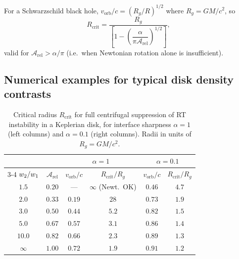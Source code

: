 For a Schwarzschild black hole,
$v_{\mathrm{orb}}/c = (R_{g}/R)^{1/2}$ where
$R_{g} = GM/c^{2}$, so
\begin{equation}
\boxed{\;
R_{\mathrm{crit}}
  = \frac{R_{g}}{\left[1 - \left(\dfrac{\alpha}
    {\pi\mathcal{A}_{\mathrm{rel}}}\right)^{1/2}\right]},
\;}
\label{eq:rel95-Rcrit}
\end{equation}
valid for $\mathcal{A}_{\mathrm{rel}} > \alpha/\pi$ (i.e.\ when
Newtonian rotation alone is insufficient).

\subsection{Numerical examples for typical disk density contrasts}

\begin{table}[htbp]
\centering
\caption{Critical radius $R_{\mathrm{crit}}$ for full centrifugal
suppression of RT instability in a Keplerian disk, for interface
sharpness $\alpha = 1$ (left columns) and $\alpha = 0.1$ (right
columns).  Radii in units of $R_{g} = GM/c^{2}$.}
\label{tab:rel-Rcrit}
\begin{tabular}{cccccc}
\hline
 & & \multicolumn{2}{c}{$\alpha = 1$}
 & \multicolumn{2}{c}{$\alpha = 0.1$} \\
\cline{3-4}\cline{5-6}
$w_{2}/w_{1}$ &
$\mathcal{A}_{\mathrm{rel}}$ &
$v_{\mathrm{orb}}/c$ & $R_{\mathrm{crit}}/R_{g}$ &
$v_{\mathrm{orb}}/c$ & $R_{\mathrm{crit}}/R_{g}$ \\
\hline
$1.5$ & $0.20$ & --- & $\infty$ (Newt.\ OK) &
  $0.46$ & $4.7$ \\
$2.0$ & $0.33$ & $0.19$ & $28$ &
  $0.73$ & $1.9$ \\
$3.0$ & $0.50$ & $0.44$ & $5.2$ &
  $0.82$ & $1.5$ \\
$5.0$ & $0.67$ & $0.57$ & $3.1$ &
  $0.86$ & $1.4$ \\
$10.0$ & $0.82$ & $0.66$ & $2.3$ &
  $0.89$ & $1.3$ \\
$\infty$ & $1.00$ & $0.72$ & $1.9$ &
  $0.91$ & $1.2$ \\
\hline
\end{tabular}
\end{table}

